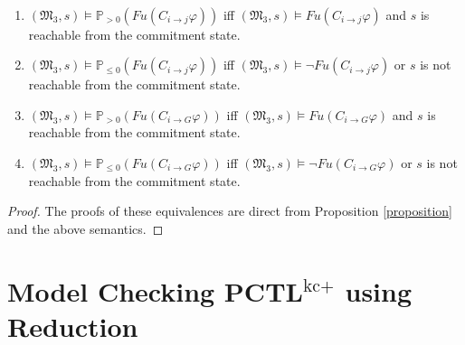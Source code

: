 
\begin{theorem}  \label{theorem:Fulfiilemt-Equivelances} ~

\begin{enumerate}
\item $(\mathfrak{M_3},s)\models \mathbb{P}_{>0} (Fu(C_{i \rightarrow
j}\varphi))$ iff $(\mathfrak{M_3},s)\models Fu(C_{i \rightarrow
j}\varphi)$ and $s$ is reachable from the commitment state.

\item $(\mathfrak{M_3},s)\models \mathbb{P}_{\leq0} (Fu(C_{i \rightarrow
j}\varphi))$ iff $(\mathfrak{M_3},s)\models \neg Fu(C_{i \rightarrow
j}\varphi)$ or $s$ is not reachable from the commitment state.

\item $(\mathfrak{M_3},s)\models \mathbb{P}_{>0} (Fu(C_{i \rightarrow
G}\varphi))$ iff $(\mathfrak{M_3},s)\models Fu(C_{i \rightarrow
G}\varphi)$ and $s$ is reachable from the commitment state.

\item $(\mathfrak{M_3},s)\models \mathbb{P}_{\leq0} (Fu(C_{i \rightarrow
G}\varphi))$ iff $(\mathfrak{M_3},s)\models \neg Fu(C_{i \rightarrow
G}\varphi)$ or $s$ is not reachable from the commitment state.
\end{enumerate}

\end{theorem}

\begin{proof} %
The proofs of these equivalences are direct from Proposition
\ref{proposition} and the above semantics.

 \end{proof}


\section{Model Checking PCTL$^{\textrm{kc+}}$ using Reduction} \label{sec:model-checking-pctlkc+}

